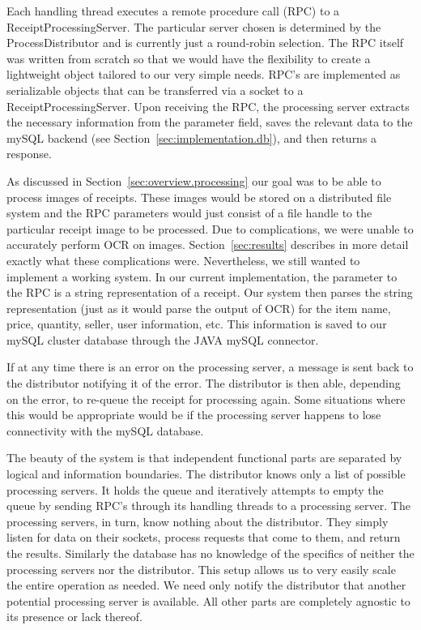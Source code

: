 Each handling thread executes a remote procedure call (RPC) to a
ReceiptProcessingServer. The particular server chosen is determined by
the ProcessDistributor and is currently just a round-robin
selection. The RPC itself was written from scratch so that we would
have the flexibility to create a lightweight object tailored to our
very simple needs. RPC's are implemented as serializable objects that
can be transferred via a socket to a ReceiptProcessingServer. Upon
receiving the RPC, the processing server extracts the necessary
information from the parameter field, saves the relevant data to the
mySQL backend (see Section~\ref{sec:implementation.db}), and then
returns a response.

As discussed in Section~\ref{sec:overview.processing} our goal was to
be able to process images of receipts. These images would be stored on
a distributed file system and the RPC parameters would just consist of
a file handle to the particular receipt image to be processed. Due to
complications, we were unable to accurately perform OCR on
images. Section~\ref{sec:results} describes in more detail exactly
what these complications were. Nevertheless, we still wanted to
implement a working system. In our current
implementation, the parameter to the RPC is a string representation of
a receipt. Our system then parses the string representation (just as
it would parse the output of OCR) for the item name, price, quantity,
seller, user information, etc. This information is saved to our mySQL
cluster database through the JAVA mySQL connector.

If at any time there is an error on the processing server, a message
is sent back to the distributor notifying it of the error. The
distributor is then able, depending on the error, to re-queue the
receipt for processing again. Some situations where this would be
appropriate would be if the processing server happens to lose
connectivity with the mySQL database.

The beauty of the system is that independent functional parts are
separated by logical and information boundaries. The distributor knows
only a list of possible processing servers. It holds the queue and
iteratively attempts to empty the queue by sending RPC's through its
handling threads to a processing server. The processing servers, in
turn, know nothing about the distributor. They simply listen for data
on their sockets, process requests that come to them, and return the
results. Similarly the database has no knowledge of the specifics of
neither the processing servers nor the distributor. This setup allows
us to very easily scale the entire operation as needed. We need only
notify the distributor that another potential processing server is
available. All other parts are completely agnostic to its presence or
lack thereof.

